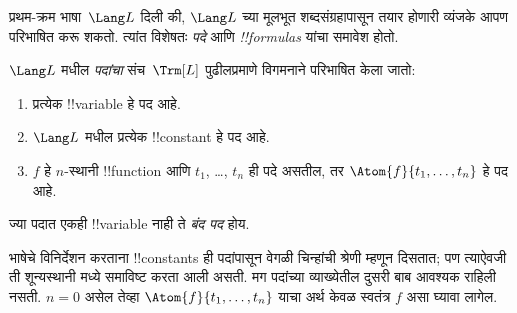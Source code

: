 \documentclass[../../../include/open-logic-section]{subfiles}
\begin{document}


प्रथम-क्रम भाषा~$\Lang L$ दिली की, $\Lang L$ च्या मूलभूत
शब्दसंग्रहापासून तयार होणारी व्यंजके आपण परिभाषित करू शकतो. त्यांत
विशेषतः \emph{पदे} आणि \emph{!!{formula}s} यांचा समावेश होतो.

\begin{defn}[पदे]
$\Lang L$ मधील \emph{पदांचा} संच~$\Trm[L]$ पुढीलप्रमाणे विगमनाने
परिभाषित केला जातो:
\begin{enumerate}
\item प्रत्येक !!{variable} हे पद आहे.
\item $\Lang L$ मधील प्रत्येक !!{constant} हे पद आहे.
\item $f$ हे $n$-स्थानी !!{function} आणि $t_1$, \dots, $t_n$ ही
  पदे असतील, तर $\Atom{f}{t_1, \ldots, t_n}$ हे पद आहे.
\end{enumerate}
ज्या पदात एकही !!{variable} नाही ते \emph{बंद पद} होय.
\end{defn}

\begin{explain}
भाषेचे विनिर्देशन करताना !!{constant}s ही पदांपासून वेगळी चिन्हांची
श्रेणी म्हणून दिसतात; पण त्याऐवजी ती शून्यस्थानी मध्ये
समाविष्ट करता आली असती. मग पदांच्या व्याख्येतील दुसरी बाब आवश्यक
राहिली नसती. $n = 0$ असेल तेव्हा $\Atom{f}{t_1, \ldots, t_n}$ याचा
अर्थ केवळ स्वतंत्र $f$ असा घ्यावा लागेल.
\end{explain}
\end{document}
